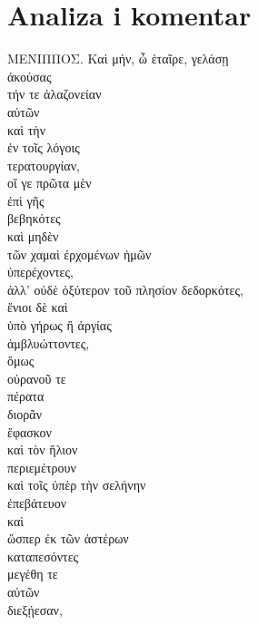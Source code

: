 \section*{Analiza i komentar}


{\large
\begin{greek}
\noindent ΜΕΝΙΠΠΟΣ. Καὶ μήν, ὦ ἑταῖρε, γελάσῃ \\
ἀκούσας \\
\tabto{2em} τήν τε ἀλαζονείαν \\
\tabto{4em} αὐτῶν \\
\tabto{2em} καὶ τὴν \\
\tabto{4em} ἐν τοῖς λόγοις \\
\tabto{2em} τερατουργίαν, \\
οἵ γε πρῶτα μὲν \\
\tabto{2em} ἐπὶ γῆς \\
βεβηκότες \\
καὶ μηδὲν \\
\tabto{2em} τῶν χαμαὶ ἐρχομένων ἡμῶν \\
ὑπερέχοντες, \\
ἀλλ' οὐδὲ ὀξύτερον τοῦ πλησίον δεδορκότες, \\
ἔνιοι δὲ καὶ \\
\tabto{2em} ὑπὸ γήρως ἢ ἀργίας \\
ἀμβλυώττοντες, \\
ὅμως \\
\tabto{4em} οὐρανοῦ τε \\
\tabto{2em} πέρατα \\
\tabto{2em} διορᾶν \\
ἔφασκον \\
καὶ τὸν ἥλιον \\
περιεμέτρουν \\
καὶ τοῖς ὑπὲρ τὴν σελήνην \\
ἐπεβάτευον \\
καὶ \\
\tabto{2em} ὥσπερ ἐκ τῶν ἀστέρων \\
καταπεσόντες \\
μεγέθη τε \\
\tabto{2em} αὐτῶν \\
διεξῄεσαν,\\

\end{greek}
}

